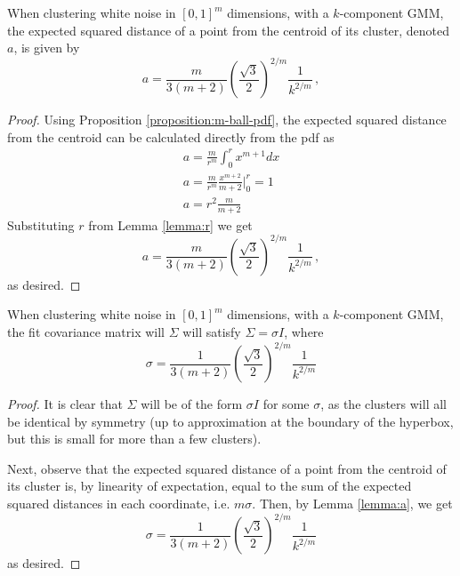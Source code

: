 \begin{lemma} \label{lemma:a}
 When clustering white noise in $[0,1]^m$ dimensions, with a $k$-component GMM, the expected squared distance of a point from the centroid of its cluster, denoted $a$, is given by
 \begin{equation} \label{eq:a}
a = \frac{m}{3(m+2)}\left(\frac{\sqrt{3}}{2}\right)^{2/m}\frac{1}{k^{2/m}}\,,
\end{equation}
\end{lemma}
\begin{proof}
Using Proposition \ref{proposition:m-ball-pdf}, the expected squared distance from the centroid can be calculated directly from the pdf as
\begin{gather*}
    a = \frac{m}{r^m}\int_{0}^r x^{m+1}dx \\
    a = \frac{m}{r^m} \frac{x^{m+2}}{m+2} \big |_0^r = 1\\
    a = r^2\frac{m}{m+2}
\end{gather*}
Substituting $r$ from Lemma \ref{lemma:r} we get
\[
a = \frac{m}{3(m+2)}\left(\frac{\sqrt{3}}{2}\right)^{2/m}\frac{1}{k^{2/m}}\,,
\]
as desired.
\end{proof}

\begin{lemma} \label{lemma:variance}
When clustering white noise in $[0,1]^m$ dimensions, with a $k$-component GMM, the fit covariance matrix will $\Sigma$ will satisfy $\Sigma = \sigma I$, where 
\[
\sigma = \frac{1}{3(m+2)}\left(\frac{\sqrt{3}}{2}\right)^{2/m}\frac{1}{k^{2/m}}
\]
\end{lemma}

\begin{proof}
It is clear that $\Sigma$ will be of the form $\sigma I$ for some $\sigma$, as the clusters will all be identical by symmetry (up to approximation at the boundary of the hyperbox, but this is small for more than a few clusters). 

Next, observe that the expected squared distance of a point from the centroid of its cluster is, by linearity of expectation, equal to the sum of the expected squared distances in each coordinate, i.e. $m\sigma$. Then, by Lemma \ref{lemma:a}, we get 
\[
\sigma = \frac{1}{3(m+2)}\left(\frac{\sqrt{3}}{2}\right)^{2/m}\frac{1}{k^{2/m}}
\]
as desired.
\end{proof}

